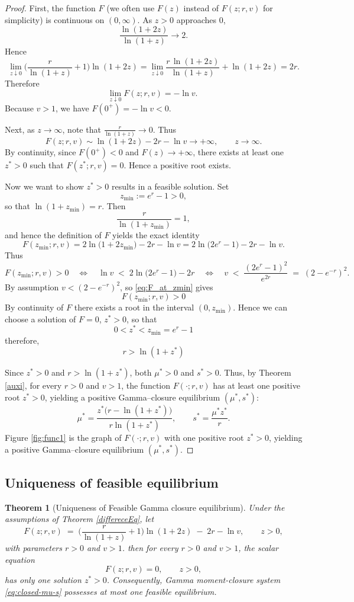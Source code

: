 \documentclass[12pt]{article}
\newtheorem{theorem}{Theorem}[section]
\theoremstyle{definition}
\begin{document}
\begin{proof}
First, the function $F$ (we often use $F(z)$ instead of $F(z;r,v)$ for simplicity) is continuous on $(0,\infty)$. As $z >0$ approaches $0$, 
\[
\frac{\ln(1+2z)}{\ln(1+z)}\to 2.
\]
Hence
\[
\lim_{z\downarrow0}\!\Big(\frac{r}{\ln(1+z)}+1\Big)\!\ln(1+2z)
= \lim_{z\downarrow0}\!\frac{r\,\ln(1+2z)}{\ln(1+z)} + \ln(1+2z)
=2r.
\]
Therefore
\[
\lim_{z\downarrow0}F(z;r,v)=-\ln v.\;
\]
Because $v>1$, we have $F(0^+)=-\ln v<0$.

Next, as $z\to\infty$, note that $\frac{r}{\ln(1+z)}\to 0$. Thus
\[
F(z;r,v)\sim \ln(1+2z)-2r-\ln v\to+\infty,\qquad z\to\infty.
\]
By continuity, since $F(0^+)<0$ and $F(z)\to+\infty$, there exists at least one $z^*>0$ such that $F(z^*;r,v)=0$. Hence a positive root exists.

Now we want to show $z^*>0$  results in a feasible solution. Set
\[
z_{\min}:=e^{r}-1>0,
\]
so that \(\ln(1+z_{\min})=r\). Then
\[
\frac{r}{\ln(1+z_{\min})}=1,
\]
and hence the definition of \(F\) yields the exact identity
\begin{equation}
F(z_{\min};r,v)
=2\ln\big(1+2z_{\min}\big)-2r-\ln v
=2\ln\!\big(2e^{r}-1\big)-2r-\ln v.
\label{eq:F_at_zmin}
\end{equation}
Thus
\begin{equation}
F(z_{\min};r,v)>0
\quad\Longleftrightarrow\quad
\ln v \;<\; 2\ln\!\big(2e^{r}-1\big) - 2r
\quad\Longleftrightarrow\quad
v \;<\; \frac{(2e^{r}-1)^2}{e^{2r}} \;=\; (2-e^{-r})^2.
\label{eq:vcondition}
\end{equation}
By assumption \(v<(2-e^{-r})^2\), so \eqref{eq:F_at_zmin} gives 
$$F(z_{\min};r,v)>0$$
By continuity of \(F\) there exists a root in the interval \((0,z_{\min})\). Hence we can choose a solution of $F=0$, $z^*>0$, so that 
$$
0<z^*<z_{\min}=e^{r}-1
$$
therefore,  $$r>\ln(1+z^*)$$ 

Since $z^*>0$ and $r>\ln(1+z^*)$, both $\mu^*>0$ and $s^*>0$. Thus, by Theorem \ref{auxi}, for every $r>0$ and $v>1$, the function $F(\cdot;r,v)$ has at least one positive root $z^*>0$, yielding a positive Gamma--closure equilibrium $(\mu^*,s^*)$: 
\[
\mu^*=\frac{z^*\big(r-\ln(1+z^*)\big)}{r\ln(1+z^*)},\qquad
s^*=\frac{\mu^* z^*}{r}.
\]
Figure \ref{fig:func1} is the graph of $F(\cdot;r,v)$ with one positive root $z^*>0$, yielding a positive Gamma--closure equilibrium $(\mu^*,s^*)$.
\end{proof}

\subsection{Uniqueness of feasible equilibrium}
\begin{theorem}[Uniqueness of Feasible Gamma closure equilibrium]\label{uniqueness} Under the assumptions of Theorem \ref{differeceEq}, 
let
\[
F(z;r,v)\;=\;\Big(\frac{r}{\ln(1+z)}+1\Big)\ln(1+2z)\;-\;2r-\ln v,\qquad z>0,
\]
with parameters $r>0$ and $v>1$. then for every $r>0$ and $v>1$, the scalar equation
\[
F(z;r,v)=0,\qquad z>0,
\]
has only one solution $z^*>0$. Consequently, Gamma moment-closure system \eqref{eq:closed-mu-s} possesses at most one feasible equilibrium.
\end{theorem}
\end{document}
